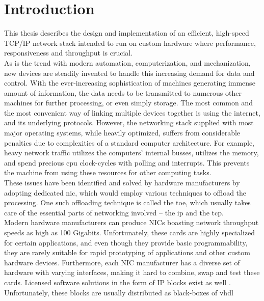 \chapter{Introduction}
This thesis describes the design and implementation of an efficient, high-speed
TCP/IP network stack intended to run on custom hardware where performance, responsiveness
and throughput is crucial.\\

As is the trend with modern automation, computerization, and mechanization, new
devices are steadily invented to handle this increasing demand for data and
control.
With the ever-increasing sophistication of machines generating immense amount
of information, the data needs to be transmitted to numerous other machines for
further processing, or even simply storage. The most common and the most convenient
way of linking multiple devices together is using the internet, and its underlying
protocols. However, the networking stack supplied with most major operating
systems, while heavily optimized, suffers from considerable penalties due to
complexities of a standard computer architecture. For example, heavy network
traffic utilizes the computers' internal busses, utilizes the memory, and spend
precious \gls{cpu} clock-cycles with polling and interrupts. This
prevents the machine from using these resources for other computing tasks.\\
These issues have been identified and solved by hardware manufacturers by
adopting dedicated \gls{nic}, which would employ
various techniques to offload the processing. One such offloading technique is
called the \gls{toe}, which usually takes care of the essential
parts of networking involved -- the \gls{ip} and the \gls{tcp}\cite{TCP_offload_dumb_idea}.\\
Modern hardware manufacturers can produce NICs boasting network throughput
speeds as high as 100 Gigabits\cite{xilinx_100g_nic}. Unfortunately, these cards
are highly specialized for certain applications, and even though they provide
basic programmability, they are rarely suitable for rapid prototyping of
applications and other custom hardware devices. Furthermore, each NIC manufacturer
has a diverse set of hardware with varying interfaces, making it hard to
combine, swap and test these cards.
Licensed software solutions in the form of IP blocks exist as well
\cite{microtronix_ip_cores}\cite{avnet_ip_cores}. Unfortunately,
these blocks are usually distributed as black-boxes of \gls{vhdl}
